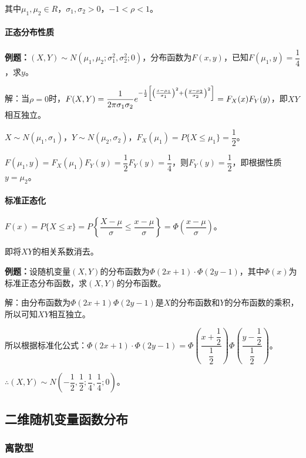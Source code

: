 其中$\mu_1,\mu_2\in R$，$\sigma_1,\sigma_2>0$，$-1<\rho<1$。

\paragraph{正态分布性质} \leavevmode \medskip

\textbf{例题：}$(X,Y)\sim N(\mu_1,\mu_2;\sigma_1^2,\sigma_2^2;0)$，分布函数为$F(x,y)$，已知$F(\mu_1,y)=\dfrac{1}{4}$，求$y$。

解：当$\rho=0$时，$F(X,Y)=\dfrac{1}{2\pi\sigma_1\sigma_2}e^{-\frac{1}{2}\left[\left(\frac{x-\mu_1}{\sigma_1}\right)^2+\left(\frac{y-\mu_2}{\sigma_2}\right)^2\right]}\\=F_X(x)F_Y(y)$，即$XY$相互独立。

$X\sim N(\mu_1,\sigma_1)$，$Y\sim N(\mu_2,\sigma_2)$，$F_X(\mu_1)=P\{X\leqslant\mu_1\}=\dfrac{1}{2}$。

$F(\mu_1,y)=F_X(\mu_1)F_Y(y)=\dfrac{1}{2}F_Y(y)=\dfrac{1}{4}$，则$F_Y(y)=\dfrac{1}{2}$，即根据性质$y=\mu_2$。

\paragraph{标准正态化} \leavevmode \medskip

$F(x)=P\{X\leqslant x\}=P\left\{\dfrac{X-\mu}{\sigma}\leqslant\dfrac{x-\mu}{\sigma}\right\}=\varPhi\left(\dfrac{x-\mu}{\sigma}\right)$。

即将$XY$的相关系数消去。

\textbf{例题：}设随机变量$(X,Y)$的分布函数为$\varPhi(2x+1)\cdot\varPhi(2y-1)$，其中$\varPhi(x)$为标准正态分布函数，求$(X,Y)$的分布函数。

解：由分布函数为$\varPhi(2x+1)\varPhi(2y-1)$是$X$的分布函数和$Y$的分布函数的乘积，所以可知$XY$相互独立。

所以根据标准化公式：$\varPhi(2x+1)\cdot\varPhi(2y-1)=\varPhi\left(\dfrac{x+\dfrac{1}{2}}{\dfrac{1}{2}}\right)\varPhi\left(\dfrac{y-\dfrac{1}{2}}{\dfrac{1}{2}}\right)$。

$\therefore(X,Y)\sim N\left(-\dfrac{1}{2},\dfrac{1}{2};\dfrac{1}{4},\dfrac{1}{4};0\right)$。

\subsection{二维随机变量函数分布}

\subsubsection{离散型}

